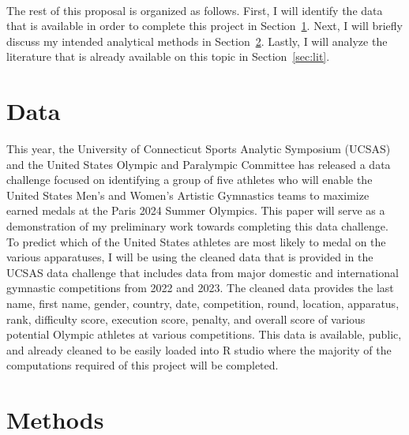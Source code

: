 \documentclass[12pt]{article}
\begin{document}
\\

The rest of this proposal is organized as follows. First, I will identify the data that is available
 in order to complete this project in Section~\ref{sec:data}. Next, I will briefly discuss my intended 
 analytical methods in Section~\ref{sec:meth}. Lastly, I will analyze the literature that is already 
 available on this topic in Section~\ref{sec:lit}.

\section{Data}
\label{sec:data}

This year, the University of Connecticut Sports Analytic Symposium (UCSAS) and the United States 
Olympic and Paralympic Committee has released a data challenge focused on identifying a group of 
five athletes who will enable the United States Men's and Women's Artistic Gymnastics teams to 
maximize earned medals at the Paris 2024 Summer Olympics. This paper will serve as a demonstration
of my preliminary work towards completing this data challenge. To predict which of the United States 
athletes are most likely to medal on the various apparatuses, I will be using the cleaned data that 
is provided in the UCSAS data challenge that includes data from major domestic and international 
gymnastic competitions from 2022 and 2023. The cleaned data provides the last name, first name, gender, 
country, date, competition, round, location, apparatus, rank, difficulty score, execution score, penalty, 
and overall score of various potential Olympic athletes at various competitions. This data is available, 
public, and already cleaned to be easily loaded into R studio where the majority of the computations 
required of this project will be completed.

\section{Methods}
\label{sec:meth}
\end{document}
